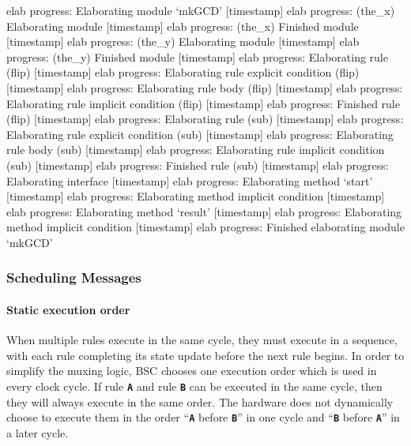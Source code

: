 \documentclass{article}
\newenvironment{centerboxverbatim}
  {\center
   \boxedverbatim}
  {\endboxedverbatim
  {\endcenter }}
\begin{document}
\begin{centerboxverbatim}
[timestamp] elab progress: Elaborating module `mkGCD'
[timestamp] elab progress: (the_x) Elaborating module
[timestamp] elab progress: (the_x) Finished module
[timestamp] elab progress: (the_y) Elaborating module
[timestamp] elab progress: (the_y) Finished module
[timestamp] elab progress: Elaborating rule (flip)
[timestamp] elab progress: Elaborating rule explicit condition (flip)
[timestamp] elab progress: Elaborating rule body (flip)
[timestamp] elab progress: Elaborating rule implicit condition (flip)
[timestamp] elab progress: Finished rule (flip)
[timestamp] elab progress: Elaborating rule (sub)
[timestamp] elab progress: Elaborating rule explicit condition (sub)
[timestamp] elab progress: Elaborating rule body (sub)
[timestamp] elab progress: Elaborating rule implicit condition (sub)
[timestamp] elab progress: Finished rule (sub)
[timestamp] elab progress: Elaborating interface
[timestamp] elab progress: Elaborating method `start'
[timestamp] elab progress: Elaborating method implicit condition
[timestamp] elab progress: Elaborating method `result'
[timestamp] elab progress: Elaborating method implicit condition
[timestamp] elab progress: Finished elaborating module `mkGCD'
\end{centerboxverbatim}


\subsubsection{Scheduling Messages}
\label{sched-msgs}
\paragraph{Static execution order}

When multiple rules execute in the same cycle, they must execute in a
sequence, with each rule completing its state update before the next
rule begins.  In order to simplify the muxing logic,
BSC chooses one execution order which is used in every clock
cycle.  If rule {\bf\tt A} and rule {\bf\tt B} can be executed in the
same cycle, then they will always execute in the same order.  The
hardware does not dynamically choose to execute them in the order
``{\bf\tt A} before {\bf\tt B}'' in one cycle and ``{\bf\tt B} before
{\bf\tt A}'' in a later cycle.
\end{document}
